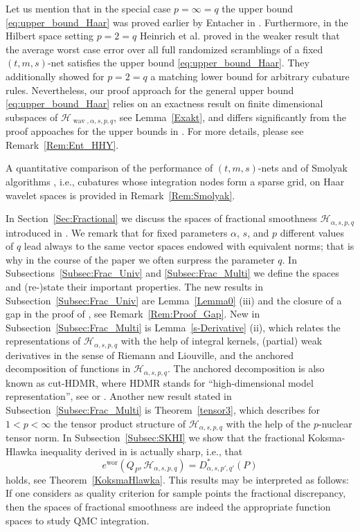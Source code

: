 \documentclass[12pt]{article}
\DeclareMathOperator{\wav}{wav}
\DeclareMathOperator{\wor}{wor}
\newcommand{\mig}[1]{\textcolor{blue}{#1}}
\begin{document}
 Let us mention that in the special case $p=\infty =q$ the upper bound \eqref{eq:upper_bound_Haar} was proved earlier by Entacher in \cite{Ent97}.
 Furthermore, in the Hilbert space setting $p=2=q$ Heinrich et al. proved  in \cite{HHY04} the weaker result that the average worst case error over all full randomized scramblings \cite{Owen95} 
 of a fixed $(t,m,s)$-net satisfies the upper bound \eqref{eq:upper_bound_Haar}.
 They additionally showed for $p=2=q$ a matching lower bound for arbitrary cubature rules. Nevertheless, our proof approach for the general upper bound \eqref{eq:upper_bound_Haar} relies on an exactness result on finite dimensional subspaces of $\mathcal{H}_{\wav, \alpha, s, p,q}$, see Lemma~\ref{Exakt}, and differs significantly from the proof appoaches for the upper bounds in \cite{Ent97, HHY04}. 
 For more details, please see
 Remark~\ref{Rem:Ent_HHY}.
 
A quantitative comparison of the performance of $(t,m,s)$-nets and of Smolyak algorithms \cite{Smo63}, i.e., cubatures whose integration nodes form a sparse grid, on Haar wavelet spaces is provided in Remark~\ref{Rem:Smolyak}.

In Section~\ref{Sec:Fractional} we discuss the spaces of fractional smoothness 
$\mathcal{H}_{\alpha, s, p,q}$ introduced in \cite{D08}. We remark that for fixed parameters $\alpha$, $s$, and $p$ different values of $q$ lead always to the same vector spaces endowed with equivalent norms; that is why in the course of the paper we often surpress the parameter $q$. In Subsections~\ref{Subsec:Frac_Univ} and 
\ref{Subsec:Frac_Multi} we define the spaces and (re-)state their important properties.
The new results in Subsection~\ref{Subsec:Frac_Univ} are Lemma~\ref{Lemma0} (iii) and the closure of a gap in the proof of \cite[Lemma~1]{D08}, see Remark~\ref{Rem:Proof_Gap}. New in Subsection~\ref{Subsec:Frac_Multi} is Lemma~\ref{s-Derivative} (ii),
which relates the representations of %
$\mathcal{H}_{\alpha, s, p,q}$ with the help of integral kernels, (partial) weak derivatives in the sense of Riemann and Liouville, and the anchored decomposition 
of functions in $\mathcal{H}_{\alpha, s, p,q}$. 
The anchored decomposition is also known as cut-HDMR, where HDMR stands for ``high-dimensional model representation'', see \cite{RA99} or \cite{Gri06, KSWW10}. Another new result stated in Subsection~\ref{Subsec:Frac_Multi} is Theorem~\ref{tensor3}, 
which describes for $1<p<\infty$ the tensor product structure of $\mathcal{H}_{\alpha, s, p,q}$ with the help of the $p$-nuclear tensor norm.
In Subsection~\ref{Subsec:SKHI} we show that the fractional Koksma-Hlawka inequality derived in \cite{D08} is actually sharp, i.e., that
\begin{equation}\label{Int:sharp_KH_inequality}
e^{\wor}(Q_P, \mathcal{H}_{\alpha, s,p, q}) = D^*_{\alpha,s,p',q'}(P)
\end{equation}
holds,
see Theorem~\ref{KoksmaHlawka}. 
This results may be interpreted as follows: If one considers as quality criterion for sample points  the fractional discrepancy, then the spaces of fractional smoothness are indeed the appropriate function spaces to study QMC integration.
\end{document}
